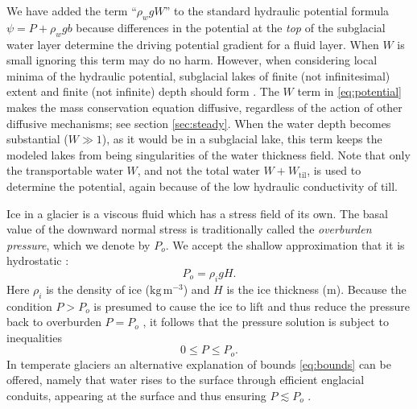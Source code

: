 \documentclass[gmd]{copernicus}   %
\newcommand{\text}{\textrm}
\newcommand{\Wtil}{W_{\text{til}}}
\begin{document}
We have added the term ``$\rho_w g W$'' to the standard hydraulic potential formula $\psi = P + \rho_w g b$ \citep{Clarke05,Shreve1972} because differences in the potential at the \emph{top} of the subglacial water layer determine the driving potential gradient for a fluid layer.  When $W$ is small ignoring this term may do no harm.  However, when considering local minima of the hydraulic potential, subglacial lakes of finite (not infinitesimal) extent and finite (not infinite) depth should form \citep[compare][]{Siegertetal2009}.  The $W$ term in \eqref{eq:potential} makes the mass conservation equation diffusive, regardless of the action of other diffusive mechanisms; see section \ref{sec:steady}.  When the water depth becomes substantial ($W\gg 1$), as it would be in a subglacial lake, this term keeps the modeled lakes from being singularities of the water thickness field.  Note that only the transportable water $W$, and not the total water $W+\Wtil$, is used to determine the potential, again because of the low hydraulic conductivity of till.

Ice in a glacier is a viscous fluid which has a stress field of its own.  The basal value of the downward normal stress is traditionally called the \emph{overburden pressure}, which we denote by $P_o$.  We accept the shallow approximation that it is hydrostatic \citep{GreveBlatter2009}:
\begin{equation} \label{eq:hydrostatic}
  P_o = \rho_i g H.
\end{equation}
Here $\rho_i$ is the density of ice ($\text{kg}\,\text{m}^{-3}$) and $H$ is the ice thickness (m).  Because the condition $P>P_o$ is presumed to cause the ice to lift and thus reduce the pressure back to overburden $P=P_o$ \citep{Schoofetal2012}, it follows that the pressure solution is subject to inequalities
\begin{equation}
0 \le P \le P_o. \label{eq:bounds}
\end{equation}
In temperate glaciers an alternative explanation of bounds \eqref{eq:bounds} can be offered, namely that water rises to the surface through efficient englacial conduits, appearing at the surface and thus ensuring $P\lesssim P_o$ \citep{Bartholomausetal2011}.
\end{document}
